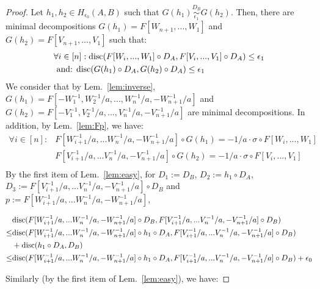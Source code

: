 \documentclass{article} %
\newcommand{\disc}{\textnormal{disc}}
\begin{document}
\begin{proof}
Let $h_1, h_2 \in H_{\epsilon_0}(A,B)$ such that $G(h_1) \overset{D_B}{\underset{\epsilon_1}{\sim}} G(h_2)$. Then, there are minimal decompositions $G(h_1) = F[W_{n+1},...,W_1] $ and $G(h_2) = F[V_{n+1},...,V_1]$ such that:
\begin{equation}
\begin{aligned}
&\forall i \in [n]: \disc(F[W_i,...,W_1] \circ D_A,F[V_i,...,V_1] \circ D_A) \leq \epsilon_1 \\
&\textnormal{ and: } \disc(G(h_1) \circ D_A,G(h_2) \circ D_A) \leq \epsilon_1
\end{aligned}
\end{equation}
We consider that by Lem.~\ref{lem:inverse}, $G(h_1) = F[-W^{-1}_1,W^{-1}_2/a,...,W^{-1}_n/a,-W^{-1}_{n+1}/a]$ and $G(h_2) = F[-V^{-1}_1,V^{-1}_2/a,...,V^{-1}_n/a,-V^{-1}_{n+1}/a]$ are minimal decompositions. In addition, by Lem.~\ref{lem:Fp}, we have:
\begin{equation}
\begin{aligned}
\forall i \in [n]: &F[W^{-1}_{i+1}/a,...W^{-1}_n/a,-W^{-1}_{n+1}/a] \circ G(h_1) = -1/a \cdot \sigma \circ F[W_i,...,W_1] \\
&F[V^{-1}_{i+1}/a,...V^{-1}_n/a,-V^{-1}_{n+1}/a] \circ G(h_2) = -1/a \cdot \sigma \circ F[V_i,...,V_1] \\
\end{aligned}
\end{equation}
By the first item of Lem.~\ref{lem:easy}, for $D_1 := D_B$, $D_2 := h_1 \circ D_A$, $D_3 := F[V^{-1}_{i+1}/a,...V^{-1}_n/a,-V^{-1}_{n+1}/a] \circ D_B$ and $p := F[W^{-1}_{i+1}/a,...W^{-1}_n/a,-W^{-1}_{n+1}/a]$, 
\begin{small}
\begin{equation}
\begin{aligned}
&\disc(F[W^{-1}_{i+1}/a,...W^{-1}_n/a,-W^{-1}_{n+1}/a] \circ D_B, F[V^{-1}_{i+1}/a,...V^{-1}_n/a,-V^{-1}_{n+1}/a] \circ D_B) \\
\leq& \disc(F[W^{-1}_{i+1}/a,...W^{-1}_n/a,-W^{-1}_{n+1}/a] \circ h_1 \circ D_A, F[V^{-1}_{i+1}/a,...V^{-1}_n/a,-V^{-1}_{n+1}/a] \circ D_B) \\
&+\disc(h_1 \circ D_A, D_B) \\
\leq& \disc(F[W^{-1}_{i+1}/a,...W^{-1}_n/a,-W^{-1}_{n+1}/a] \circ h_1 \circ D_A, F[V^{-1}_{i+1}/a,...V^{-1}_n/a,-V^{-1}_{n+1}/a] \circ D_B) +\epsilon_0
\end{aligned}
\end{equation}
\end{small}
Similarly (by the first item of Lem.~\ref{lem:easy}), we have:

\end{proof}
\end{document}
